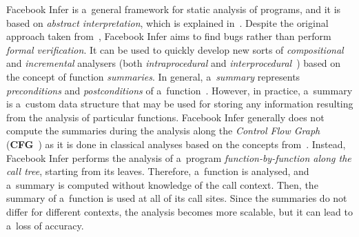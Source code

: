 \documentclass{ExcelAtFIT}
\theoremstyle{example}
\begin{document}
Facebook Infer is a~general framework for static analysis of programs, and it is based on \emph{abstract interpretation}, which is explained in~\cite{AILatticeModelCousot, staticAnalysisMoller, programAnalysisNielson, staticAnalysisRival}. Despite the original approach taken from~\cite{inferBiabduction}, Facebook Infer aims to find bugs rather than perform \emph{formal verification}. It can be used to quickly develop new sorts of \emph{compositional} and \emph{incremental} analysers (both \emph{intraprocedural} and \emph{interprocedural}~\cite{programAnalysisNielson}) based on the concept of function \emph{summaries}. In general, a~\emph{summary} represents \emph{preconditions} and \emph{postconditions} of a~function~\cite{hoare}. However, in practice, a~summary is a~custom data structure that may be used for storing any information resulting from the analysis of particular functions. Facebook Infer generally does not compute the summaries during the analysis along the \emph{Control Flow Graph} (\textbf{CFG}~\cite{controlFlowAnalysisAllen}) as it is done in classical analyses based on the concepts from~\cite{DFAGraphReach, DFAApproaches}. Instead, Facebook Infer performs the analysis of a~program \emph{function-by-function along the call tree}, starting from its leaves. Therefore, a~function is analysed, and a~summary is computed without knowledge of the call context. Then, the summary of a~function is used at all of its call sites. Since the summaries do not differ for different contexts, the analysis becomes more scalable, but it can lead to a~loss of accuracy.
\end{document}
